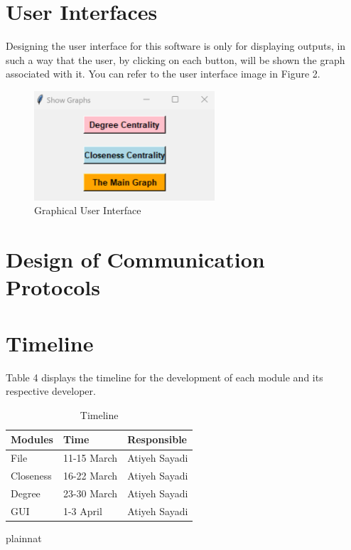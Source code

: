 \documentclass[12pt, titlepage]{article}
\begin{document}
\section{User Interfaces}

Designing the user interface for this software is only for displaying outputs, in such a way that the user, by clicking on each button, will be shown the graph associated with it. 
You can refer to the user interface image in Figure 2.

\begin{figure}[h!]
\begin{center}
 \includegraphics[width=0.6\textwidth]{GUI}
\caption{Graphical User Interface}
\label{Fig_SystemContext} 
\end{center}
\end{figure}

\section{Design of Communication Protocols}

\section{Timeline}


Table 4 displays the timeline for the development of each module and its respective developer.

\begin{table}[H]
\centering
\begin{tabular}{p{} p{}  p{}}
\toprule
 \textbf{Modules} & \textbf{Time} & \textbf{Responsible} \\
\midrule
File& 11-15 March& Atiyeh Sayadi\\
Closeness & 16-22 March& Atiyeh Sayadi\\
Degree & 23-30 March& Atiyeh Sayadi\\
GUI & 1-3 April& Atiyeh Sayadi\\
\bottomrule
\end{tabular}
\caption{Timeline}
\end{table}

 {plainnat}


\newpage{}
\end{document}
